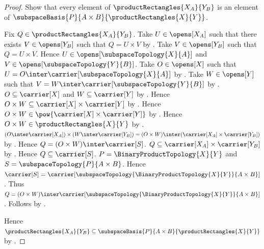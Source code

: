 \begin{proof}
    Show that every element of
        $\productRectangles{X_A}{Y_B}$ is an element of
        $\subspaceBasis{P}{A\times B}{\productRectangles{X}{Y}}$.
    \begin{subproof}
        Fix $Q\in\productRectangles{X_A}{Y_B}$.
        Take $U\in\opens[X_A]$ such that there exists
            $V\in\opens[Y_B]$ such that $Q=U\times V$ by
            .
        Take $V\in\opens[Y_B]$ such that $Q=U\times V$.
        Hence $U\in\opens[\subspaceTopology{X}{A}]$ and
            $V\in\opens[\subspaceTopology{Y}{B}]$.
        Take $O\in\opens[X]$ such that
            $U=O\inter\carrier[\subspaceTopology{X}{A}]$ by
            .
        Take $W\in\opens[Y]$ such that
            $V=W\inter\carrier[\subspaceTopology{Y}{B}]$ by
            .
        $O\subseteq\carrier[X]$ and $W\subseteq\carrier[Y]$ by
            .
        Hence $O\times W\subseteq\carrier[X]\times\carrier[Y]$ by
            .
        Hence $O\times W\in\pow{\carrier[X]\times\carrier[Y]}$ by
            .
        Hence $O\times W\in\productRectangles{X}{Y}$ by
            .
        $(O\inter\carrier[X_A])\times
            (W\inter\carrier[Y_B])
            =(O\times W)\inter
                (\carrier[X_A]\times\carrier[Y_B])$ by
            .
        Hence $Q=(O\times W)\inter\carrier[S]$.
        $Q\subseteq\carrier[X_A]\times\carrier[Y_B]$ by
            .
        Hence $Q\subseteq\carrier[S]$.
        $P=\BinaryProductTopology{X}{Y}$ and
            $S=\subspaceTopology{P}{A\times B}$.
        Hence $\carrier[S]=\carrier[\subspaceTopology{
            \BinaryProductTopology{X}{Y}}{A\times B}]$.
        Thus $Q=(O\times W)\inter
            \carrier[\subspaceTopology{
                \BinaryProductTopology{X}{Y}}{A\times B}]$.
        Follows by .
    \end{subproof}
    Hence $\productRectangles{X_A}{Y_B}\subseteq
        \subspaceBasis{P}{A\times B}{\productRectangles{X}{Y}}$ by
        .


\end{proof}
